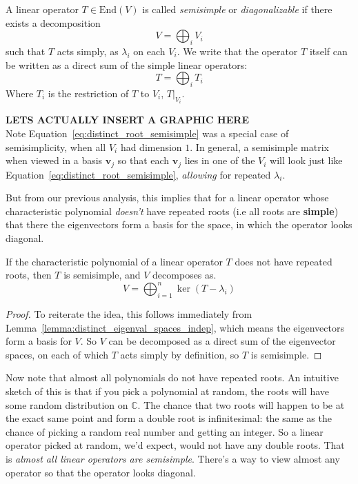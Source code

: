 	\begin{defn}[Semisimplicity]
		A linear operator $T \in \mathrm{End}(V)$ is called \emph{semisimple} or \emph{diagonalizable} if there exists a decomposition 
		\begin{equation}
			V = \bigoplus_i V_i
		\end{equation}
		such that $T$ acts simply, as $\lambda_i$ on each $V_i$. We write that the operator $T$ itself can be written as a direct sum of the simple linear operators:
		\begin{equation}
			T = \bigoplus_i T_i
		\end{equation}
		Where $T_i$ is the restriction of $T$ to $V_i$, $T|_{V_i}$.
	\end{defn}
	\textbf{LETS ACTUALLY INSERT A GRAPHIC HERE}\\
	Note Equation~\eqref{eq:distinct_root_semisimple} was a special case of semisimplicity, when all $V_i$ had dimension $1$. In general, a semisimple matrix when viewed in a basis $\mathbf v_j$ so that each $\mathbf v_j$ lies in one of the $V_i$ will look just like Equation~\eqref{eq:distinct_root_semisimple}, \emph{allowing} for repeated $\lambda_i$.
	
	But from our previous analysis, this implies that for a linear operator whose characteristic polynomial \emph{doesn't} have repeated roots (i.e  all roots are \textbf{simple}) that there the eigenvectors form a basis for the space, in which the operator looks diagonal. 
	\begin{theorem}\label{thm:semisimple_lacking_repeated_eigs}
		If the characteristic polynomial of a linear operator $T$ does not have repeated roots, then $T$ is semisimple, and $V$ decomposes as.
		\begin{equation}
			V = \bigoplus_{i=1}^n \ker(T - \lambda_i)
		\end{equation}
	\end{theorem}
	\begin{proof}
		To reiterate the idea, this follows immediately from Lemma~\ref{lemma:distinct_eigenval_spaces_indep}, which means the eigenvectors form a basis for $V$. So $V$ can be decomposed as a direct sum of the eigenvector spaces, on each of which $T$ acts simply by definition, so $T$ is semisimple. 
	\end{proof}
	
	Now note that almost all polynomials do not have repeated roots. An intuitive sketch of this is that if you pick a polynomial at random, the roots will have some random distribution on $\mathbb{C}$. The chance that two roots will happen to be at the exact same point and form a double root is infinitesimal: the same as the chance of picking a random real number and getting an integer. So a linear operator picked at random, we'd expect, would not have any double roots. That is \emph{almost all linear operators are semisimple}. There's a way to view almost any operator so that the operator looks diagonal.
	
